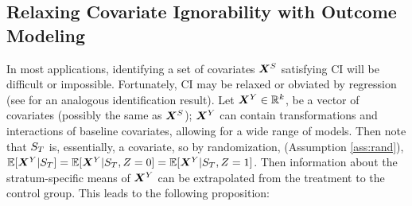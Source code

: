 \documentclass[11pt]{article} %
\begin{document}
\subsection{Relaxing Covariate Ignorability with Outcome Modeling}\label{sec:regression}
In most applications, identifying a set of covariates $\bm{X}^S$ satisfying CI will be difficult or impossible.
Fortunately, CI may be relaxed or obviated by regression (see \citealt[][\S 3.4]{jiangDing2021} for an analogous identification result).
Let $\bm{X}^Y\in \mathbb{R}^k$, be a vector of covariates (possibly the same as $\bm{X}^S$); $\bm{X}^Y$ can contain transformations and interactions of baseline covariates, allowing for a wide range of models.
Then note that $S_T$ is, essentially, a covariate, so by randomization, (Assumption \ref{ass:rand}), $\mathbb{E}[\bm{X}^Y|S_T]=\mathbb{E}[\bm{X}^Y|S_T,Z=0]=\mathbb{E}[\bm{X}^Y|S_T,Z=1]$.
Then information about the stratum-specific means of $\bm{X}^Y$ can be extrapolated from the treatment to the control group.
This leads to the following proposition:
\end{document}
